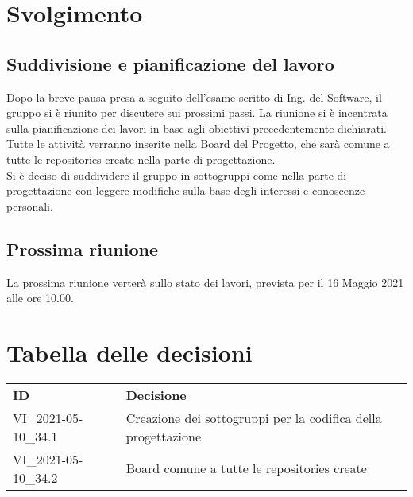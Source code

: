 \documentclass[]{article}
\begin{document}
	\newpage

	\section{Svolgimento}

	\subsection{Suddivisione e pianificazione del lavoro}
	Dopo la breve pausa presa a seguito dell'esame scritto di Ing. del Software, il gruppo si è riunito per discutere sui prossimi passi. La riunione si è incentrata sulla pianificazione dei lavori in base agli obiettivi precedentemente dichiarati.\\
	Tutte le attività verranno inserite nella Board del Progetto, che sarà comune a tutte le repositories create nella parte di progettazione.\\
	Si è deciso di suddividere il gruppo in sottogruppi come nella parte di progettazione con leggere modifiche sulla base degli interessi e conoscenze personali.


	\subsection{Prossima riunione}
La prossima riunione verterà sullo stato dei lavori, prevista per il 16 Maggio 2021 alle ore 10.00.

	\section{Tabella delle decisioni}

	\begin{table} [h!]
		\begin{center}
			\begin{tabular} { m{2cm} m{14cm} }
				\rowcolor{lightgray}
				\textbf{ID} & \textbf{Decisione}\\
				VI\_2021-05-10\_34.1 & Creazione dei sottogruppi per la codifica della progettazione \\
				VI\_2021-05-10\_34.2 & Board comune a tutte le repositories create\\
			\end{tabular}
		\end{center}
	\end{table}
\end{document}
